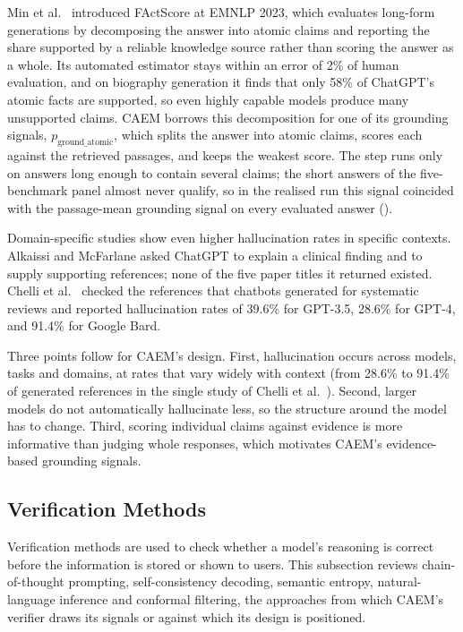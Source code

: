 Min et al.\ \cite{min-etal-2023-factscore} introduced FActScore at EMNLP 2023, which evaluates long-form generations by decomposing the answer into atomic claims and reporting the share supported by a reliable knowledge source rather than scoring the answer as a whole. Its automated estimator stays within an error of 2\% of human evaluation, and on biography generation it finds that only 58\% of ChatGPT's atomic facts are supported, so even highly capable models produce many unsupported claims. CAEM borrows this decomposition for one of its grounding signals, $p_{\text{ground\_atomic}}$, which splits the answer into atomic claims, scores each against the retrieved passages, and keeps the weakest score. The step runs only on answers long enough to contain several claims; the short answers of the five-benchmark panel almost never qualify, so in the realised run this signal coincided with the passage-mean grounding signal on every evaluated answer ().

Domain-specific studies show even higher hallucination rates in specific contexts. Alkaissi and McFarlane \cite{alkaissi2023artificial} asked ChatGPT to explain a clinical finding and to supply supporting references; none of the five paper titles it returned existed. Chelli et al.\ \cite{info:doi/10.2196/53164} checked the references that chatbots generated for systematic reviews and reported hallucination rates of 39.6\% for GPT-3.5, 28.6\% for GPT-4, and 91.4\% for Google Bard.

Three points follow for CAEM's design. First, hallucination occurs across models, tasks and domains, at rates that vary widely with context (from 28.6\% to 91.4\% of generated references in the single study of Chelli et al.~\cite{info:doi/10.2196/53164}). Second, larger models do not automatically hallucinate less, so the structure around the model has to change. Third, scoring individual claims against evidence is more informative than judging whole responses, which motivates CAEM's evidence-based grounding signals.

\subsection{Verification Methods}

Verification methods are used to check whether a model's reasoning is correct before the information is stored or shown to users. This subsection reviews chain-of-thought prompting, self-consistency decoding, semantic entropy, natural-language inference and conformal filtering, the approaches from which CAEM's verifier draws its signals or against which its design is positioned.

